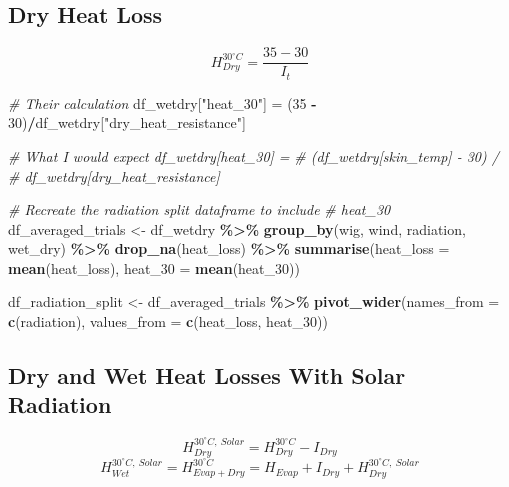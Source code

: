 \documentclass[
]{article}
\newenvironment{Shaded}{\begin{snugshade}}{\end{snugshade}}
\newcommand{\AttributeTok}[1]{\textcolor[rgb]{0.13,0.29,0.53}{#1}}
\newcommand{\CommentTok}[1]{\textcolor[rgb]{0.56,0.35,0.01}{\textit{#1}}}
\newcommand{\DecValTok}[1]{\textcolor[rgb]{0.00,0.00,0.81}{#1}}
\newcommand{\FunctionTok}[1]{\textcolor[rgb]{0.13,0.29,0.53}{\textbf{#1}}}
\newcommand{\NormalTok}[1]{#1}
\newcommand{\OtherTok}[1]{\textcolor[rgb]{0.56,0.35,0.01}{#1}}
\newcommand{\SpecialCharTok}[1]{\textcolor[rgb]{0.81,0.36,0.00}{\textbf{#1}}}
\newcommand{\StringTok}[1]{\textcolor[rgb]{0.31,0.60,0.02}{#1}}
\begin{document}
\hypertarget{dry-heat-loss}{%
\subsection{Dry Heat Loss}\label{dry-heat-loss}}

\[H_{Dry}^{30^\circ C} = \frac{35 -30}{I_t}\]

\begin{Shaded}
\begin{Highlighting}[]
\CommentTok{\# Their calculation}
\NormalTok{df\_wetdry[}\StringTok{"heat\_30"}\NormalTok{] }\OtherTok{=}\NormalTok{ (}\DecValTok{35} \SpecialCharTok{{-}} \DecValTok{30}\NormalTok{)}\SpecialCharTok{/}\NormalTok{df\_wetdry[}\StringTok{"dry\_heat\_resistance"}\NormalTok{]}

\CommentTok{\# What I would expect df\_wetdry[\textquotesingle{}heat\_30\textquotesingle{}] =}
\CommentTok{\# (df\_wetdry[\textquotesingle{}skin\_temp\textquotesingle{}] {-} 30) /}
\CommentTok{\# df\_wetdry[\textquotesingle{}dry\_heat\_resistance\textquotesingle{}]}


\CommentTok{\# Recreate the radiation split dataframe to include}
\CommentTok{\# heat\_30}
\NormalTok{df\_averaged\_trials }\OtherTok{\textless{}{-}}\NormalTok{ df\_wetdry }\SpecialCharTok{\%\textgreater{}\%}
    \FunctionTok{group\_by}\NormalTok{(wig, wind, radiation, wet\_dry) }\SpecialCharTok{\%\textgreater{}\%}
    \FunctionTok{drop\_na}\NormalTok{(heat\_loss) }\SpecialCharTok{\%\textgreater{}\%}
    \FunctionTok{summarise}\NormalTok{(}\AttributeTok{heat\_loss =} \FunctionTok{mean}\NormalTok{(heat\_loss), }\AttributeTok{heat\_30 =} \FunctionTok{mean}\NormalTok{(heat\_30))}

\NormalTok{df\_radiation\_split }\OtherTok{\textless{}{-}}\NormalTok{ df\_averaged\_trials }\SpecialCharTok{\%\textgreater{}\%}
    \FunctionTok{pivot\_wider}\NormalTok{(}\AttributeTok{names\_from =} \FunctionTok{c}\NormalTok{(radiation), }\AttributeTok{values\_from =} \FunctionTok{c}\NormalTok{(heat\_loss,}
\NormalTok{        heat\_30))}
\end{Highlighting}
\end{Shaded}

\hypertarget{dry-and-wet-heat-losses-with-solar-radiation}{%
\subsection{Dry and Wet Heat Losses With Solar
Radiation}\label{dry-and-wet-heat-losses-with-solar-radiation}}

\[H_{Dry}^{30^{\circ} C,\:Solar} = H_{Dry}^{30^{\circ} C} - I_{Dry}\]
\[H_{Wet}^{30^{\circ} C,\:Solar} = H_{Evap + Dry}^{30^{\circ} C} = H_{Evap} + I_{Dry} + H_{Dry}^{30^{\circ} C,\:Solar}\]
\end{document}
